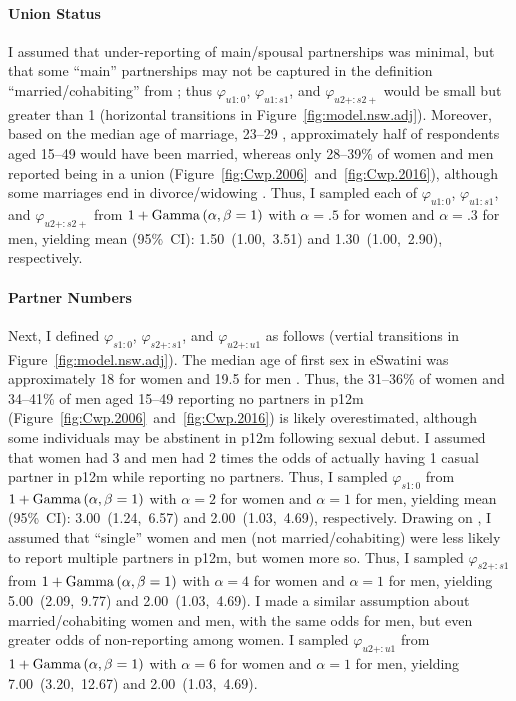 \paragraph{Union Status}
I assumed that under-reporting of main/spousal partnerships was minimal,
but that some ``main'' partnerships may not be captured in
the definition ``married/cohabiting'' from \cite{SDHS2006,SHIMS2};
thus $\varphi_{u1:0}$, $\varphi_{u1:s1}$, and $\varphi_{u2+:s2+}$
would be small but greater than 1
(horizontal transitions in Figure~\ref{fig:model.nsw.adj}).
Moreover, based on the median age of marriage, 23--29 \cite{SDHS2006},
approximately half of respondents aged 15--49 would have been married,
whereas only 28--39\% of women and men reported being in a union
(Figure~\ref{fig:Cwp.2006}~and~\ref{fig:Cwp.2016}),
although some marriages end in divorce/widowing \cite{SDHS2006}.
Thus, I sampled each of $\varphi_{u1:0}$, $\varphi_{u1:s1}$, and $\varphi_{u2+:s2+}$
from $1+\operatorname{Gamma}\,(\alpha,\beta=1)$
with $\alpha=.5$ for women and $\alpha=.3$ for men,
yielding mean (95\%~CI): 1.50~(1.00,~3.51) and 1.30~(1.00,~2.90), respectively.
\paragraph{Partner Numbers}
Next, I defined $\varphi_{s1:0}$, $\varphi_{s2+:s1}$, and $\varphi_{u2+:u1}$ as follows
(vertial transitions in Figure~\ref{fig:model.nsw.adj}).
The median age of first sex in eSwatini was
approximately 18 for women and 19.5 for men \cite{SDHS2006}.
Thus, the 31--36\% of women and 34--41\% of men aged 15--49 reporting no partners in p12m
(Figure~\ref{fig:Cwp.2006}~and~\ref{fig:Cwp.2016}) is likely overestimated,
although some individuals may be abstinent in p12m following sexual debut.
I assumed that women had 3 and men had 2 times the odds of
actually having 1 casual partner in p12m while reporting no partners.
Thus, I sampled $\varphi_{s1:0}$ from $1+\operatorname{Gamma}\,(\alpha,\beta=1)$
with $\alpha=2$ for women and $\alpha=1$ for men,
yielding mean (95\%~CI): 3.00~(1.24,~6.57) and 2.00~(1.03,~4.69), respectively.
Drawing on \cite{Behanzin2013}, I assumed that ``single'' women and men (not married/cohabiting)
were less likely to report multiple partners in p12m, but women more so.
Thus, I sampled $\varphi_{s2+:s1}$ from $1+\operatorname{Gamma}\,(\alpha,\beta=1)$
with $\alpha=4$ for women and $\alpha=1$ for men,
yielding 5.00~(2.09,~9.77) and 2.00~(1.03,~4.69).
I made a similar assumption about married/cohabiting women and men,
with the same odds for men, but even greater odds of non-reporting among women.
I sampled $\varphi_{u2+:u1}$ from $1+\operatorname{Gamma}\,(\alpha,\beta=1)$
with $\alpha=6$ for women and $\alpha=1$ for men,
yielding 7.00~(3.20,~12.67) and 2.00~(1.03,~4.69).
